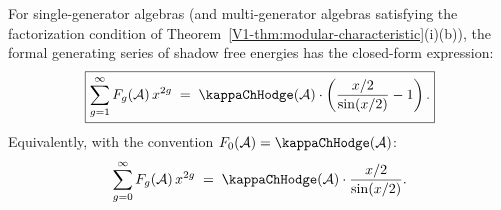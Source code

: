 \begin{theorem}
\label{thm:thqg-I-generating-function}
For single-generator algebras \textup{(}and multi-generator
algebras satisfying the factorization condition of
Theorem~\textup{\ref{V1-thm:modular-characteristic}(i)(b))},
the formal generating series of shadow free energies has the
closed-form expression:
\begin{equation}%
\boxed{ \sum_{g=1}^{\infty} F_g(\cA)\,x^{2g} \;=\; \kappaChHodge(\cA) \cdot \left( \frac{x/2}{\sin(x/2)} - 1 \right). }
\end{equation}
Equivalently, with the convention $F_0(\cA) = \kappaChHodge(\cA)$:
\begin{equation}%
\sum_{g=0}^{\infty} F_g(\cA)\,x^{2g} \;=\; \kappaChHodge(\cA) \cdot \frac{x/2}{\sin(x/2)}.
\end{equation}
\end{theorem}

